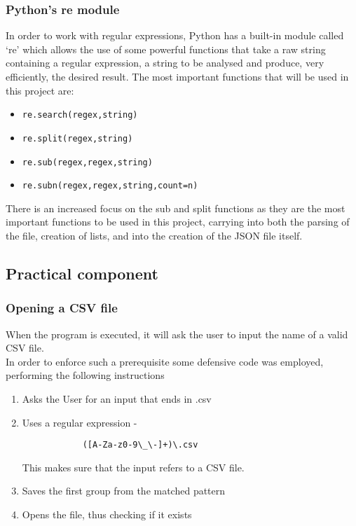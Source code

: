\documentclass[11pt,a4paper,times]{report}
\begin{document}
\subsubsection{Python's re module}In order to work with regular
expressions, Python has a built-in module called `re' which allows the
use of some powerful functions that take a raw string containing a
regular expression, a string to be analysed and produce, very
efficiently, the desired result. The most important functions that will 
be used in this project are:
\begin{itemize}
    \item{\verb|re.search(regex,string)|}
    \item{\verb|re.split(regex,string)|}
    \item{\verb|re.sub(regex,regex,string)|}
    \item{\verb|re.subn(regex,regex,string,count=n)|}
\end{itemize}
There is an increased focus on the sub and split functions as they are
the most important functions to be used in this project, carrying into
both the parsing of the file, creation of lists, and into the creation of the JSON
file itself.
\subsection{Practical component} \label{practice}

\subsubsection{Opening a CSV file} When the program is executed, it will
ask the user to input the name of a valid CSV file. \\ In order to
enforce such a prerequisite some defensive code was employed, performing
the following instructions
\begin{enumerate}
    \item{Asks the User for an input that ends in .csv}
    \item{Uses a regular expression - 
        \begin{verbatim}
            ([A-Za-z0-9\_\-]+)\.csv
        \end{verbatim}
    This makes sure that the input refers to a CSV file.}
    \item{Saves the first group from the matched pattern}
    \item{Opens the file, thus checking if it exists}
\end{enumerate}
\end{document}
